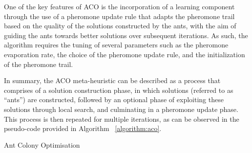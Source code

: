 One of the key features of ACO is the incorporation of a learning component
through the use of a pheromone update rule that adapts the pheromone trail based
on the quality of the solutions constructed by the ants, with the aim of guiding
the ants towards better solutions over subsequent iterations. As such, the
algorithm requires the tuning of several parameters such as the pheromone
evaporation rate, the choice of the pheromone update rule, and the
initialization of the pheromone trail.

In summary, the ACO meta-heuristic can be described as a process that comprises
of a solution construction phase, in which solutions (referred to as ``ants'')
are constructed, followed by an optional phase of exploiting these solutions
through local search, and culminating in a pheromone update phase. This process
is then repeated for multiple iterations, as can be observed in the pseudo-code
provided in Algorithm ~\ref{algorithm:aco}.

\begin{algorithm}[htb!]
  \DontPrintSemicolon
  \caption{Ant Colony Optimisation}
  \label{algorithm:aco}
\end{algorithm}